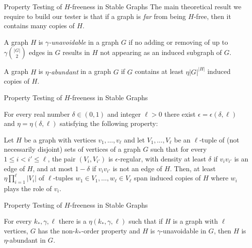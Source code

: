 \documentclass{beamer}
\newcommand{\parround}[1]{( #1 )}
\newcommand{\parstraight}[1]{| #1 |}
\begin{document}
\begin{frame}{Property Testing of $H$-freeness in Stable Graphs}
    The main theoretical result we require to build our tester is that if a graph is \emph{far} from being $H$-free,
    then it contains many copies of $H$.

    \begin{definition} \label{def:unavoidable}
        A graph $H$ is \emph{$\gamma$-unavoidable} in a graph $G$ if no adding or removing of up to $\gamma {|G| \choose 2}$
        edges in $G$ results in $H$ not appearing as an induced subgraph of $G$.
    \end{definition}

    \begin{definition} \label{def:abundant}
        A graph $H$ is \emph{$\eta$-abundant} in a graph $G$ if $G$ contains at least $\eta |G|^{|H|}$
        induced copies of $H$.
    \end{definition}
\end{frame}

\begin{frame}{Property Testing of $H$-freeness in Stable Graphs}
    \begin{lemma}
        For every real number $\delta \in \parround{0, 1}$ and integer $\ell > 0$ there exist $\epsilon = \epsilon \parround{\delta, \ell}$ and
        $\eta = \eta \parround{\delta, \ell}$ satisfying the following property:

        Let $H$ be a graph with vertices $v_1, \dots,v_\ell$ and let $V_1, \dots, V_\ell$ be an $\ell$-tuple of (not necessarily disjoint)
        sets of vertices of a graph $G$ such that for every $1 \leq i < i' \leq \ell$, the pair $\parround{V_i, V_{i'}}$
        is $\epsilon$-regular, with density at least $\delta$ if $v_i v_{i'}$ is an edge of $H$, and at most $1 - \delta$
        if $v_i v_{i'}$ is not an edge of $H$.
        Then, at least $\eta \prod_{i=1}^\ell \parstraight{V_i}$ of $\ell$-tuples $w_1 \in V_1, \dots, w_\ell \in V_\ell$
        span induced copies of $H$ where $w_i$ plays the role of $v_i$.
    \end{lemma}
\end{frame}

\begin{frame}{Property Testing of $H$-freeness in Stable Graphs}
    \begin{theorem} \label{thm:property_testing_with_stable_partitions}
        For every $k_*, \gamma, \ell$ there is a $\eta(k_*, \gamma, \ell)$ such that if $H$ is a graph with $\ell$
        vertices, $G$ has the non-$k_*$-order property and $H$ is $\gamma$-unavoidable in $G$, then $H$ is
        $\eta$-abundant in $G$.
    \end{theorem}
\end{frame}
\end{document}
